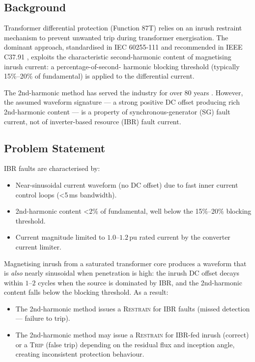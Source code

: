 \documentclass[11pt, a4paper]{article}
\newcommand{\pu}{\,\text{pu}}
\begin{document}
\subsection{Background}

Transformer differential protection (Function 87T) relies on an inrush
restraint mechanism to prevent unwanted trip during transformer energisation.
The dominant approach, standardised in IEC 60255-111 \cite{IEC60255111}
and recommended in IEEE C37.91 \cite{IEEEC3791}, exploits the characteristic
second-harmonic content of magnetising inrush current: a percentage-of-second-
harmonic blocking threshold (typically 15\%–20\% of fundamental) is applied to
the differential current.

The 2nd-harmonic method has served the industry for over 80 years
\cite{Hayward1941}.  However, the assumed waveform signature — a strong
positive DC offset producing rich 2nd-harmonic content — is a property of
synchronous-generator (SG) fault current, not of inverter-based resource (IBR)
fault current.

\subsection{Problem Statement}

IBR faults are characterised by:
\begin{itemize}
  \item Near-sinusoidal current waveform (no DC offset) due to fast inner
    current control loops (\textless 5\,ms bandwidth).
  \item 2nd-harmonic content \textless 2\% of fundamental, well below the
    15\%--20\% blocking threshold.
  \item Current magnitude limited to $1.0$--$1.2\pu$ rated current by the
    converter current limiter.
\end{itemize}

Magnetising inrush from a saturated transformer core produces a waveform
that is \emph{also} nearly sinusoidal when penetration is high: the inrush
DC offset decays within $1$--$2$ cycles when the source is dominated by
IBR, and the 2nd-harmonic content falls below the blocking threshold.
As a result:
\begin{itemize}
  \item The 2nd-harmonic method issues a \textsc{Restrain} for IBR faults
    (missed detection — failure to trip).
  \item The 2nd-harmonic method may issue a \textsc{Restrain} for IBR-fed
    inrush (correct) or a \textsc{Trip} (false trip) depending on the residual
    flux and inception angle, creating inconsistent protection behaviour.
\end{itemize}
\end{document}

